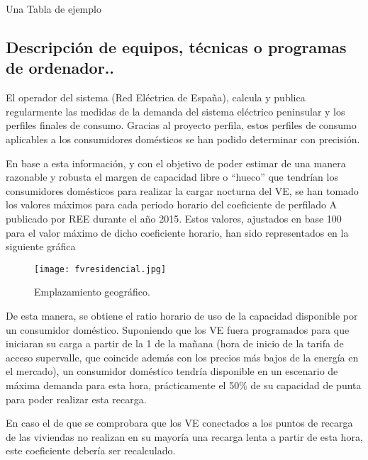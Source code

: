 \documentclass[a4paper,12pt]{article}
\begin{document}
\begin{Form}
\begin{table}[ht]
    \centering
    \caption{Una Tabla de ejemplo}
    \pgfplotstabletypeset[
        col sep=comma,
        every head row/.style={before row=\toprule, after row=\midrule},
        every last row/.style={after row=\bottomrule},
        string type %
    ]{\datosNoNumericos}
\end{table}


\subsection{Descripción de equipos, técnicas o programas de ordenador..}






El operador del sistema (Red Eléctrica de España), calcula y publica regularmente las medidas de la demanda del
sistema eléctrico peninsular y los perfiles finales de consumo. Gracias al proyecto perfila, estos perfiles de consumo
aplicables a los consumidores domésticos se han podido determinar con precisión.

En base a esta información, y con el objetivo de poder estimar de una manera razonable y robusta el margen de
capacidad libre o “hueco” que tendrían los consumidores domésticos para realizar la cargar nocturna del VE, se han
tomado los valores máximos para cada periodo horario del coeficiente de perfilado A publicado por REE durante el
año 2015. Estos valores, ajustados en base 100 para el valor máximo de dicho coeficiente horario, han sido
representados en la siguiente gráfica


\begin{figure}[h]
    \centering
    \texttt{[image: fvresidencial.jpg]} %
    \caption{Emplazamiento geográfico.}
    \label{fig:etiqueta}
  \end{figure}


De esta manera, se obtiene el ratio horario de uso de la capacidad disponible por un consumidor doméstico.
Suponiendo que los VE fuera programados para que iniciaran su carga a partir de la 1 de la mañana (hora de inicio
de la tarifa de acceso supervalle, que coincide además con los precios más bajos de la energía en el mercado), un
consumidor doméstico tendría disponible en un escenario de máxima demanda para esta hora, prácticamente el
50\% de su capacidad de punta para poder realizar esta recarga.

En caso el de que se comprobara que los VE conectados a los puntos de recarga de las viviendas no realizan en su
mayoría una recarga lenta a partir de esta hora, este coeficiente debería ser recalculado.


\end{Form}
\end{document}
